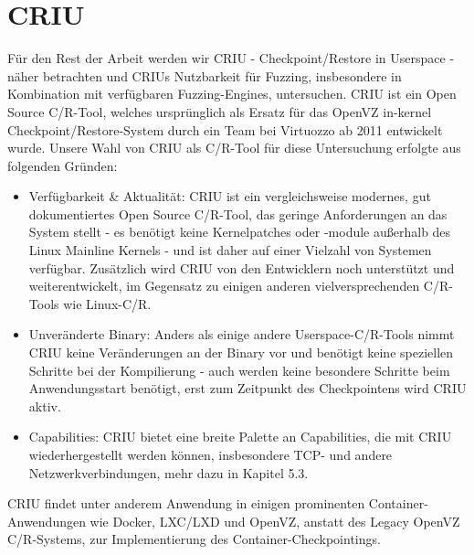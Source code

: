 \documentclass[a4paper]{article}
\begin{document}



\section{CRIU}
Für den Rest der Arbeit werden wir CRIU - Checkpoint/Restore in Userspace - näher betrachten und CRIUs Nutzbarkeit für Fuzzing, insbesondere in Kombination mit verfügbaren Fuzzing-Engines, untersuchen. 
CRIU ist ein Open Source C/R-Tool, welches ursprünglich als Ersatz für das OpenVZ in-kernel Checkpoint/Restore-System durch ein Team bei Virtuozzo ab 2011 entwickelt wurde\cite{criuhistory}. 
Unsere Wahl von CRIU als C/R-Tool für diese Untersuchung erfolgte aus folgenden Gründen:
\begin{itemize}
    \item Verfügbarkeit \& Aktualität: CRIU ist ein vergleichsweise modernes, gut dokumentiertes Open Source C/R-Tool, das geringe Anforderungen an das System stellt - es benötigt keine Kernelpatches oder -module außerhalb des Linux Mainline Kernels - und ist daher auf einer Vielzahl von Systemen verfügbar. Zusätzlich wird CRIU von den Entwicklern noch unterstützt und weiterentwickelt, im Gegensatz zu einigen anderen vielversprechenden C/R-Tools wie Linux-C/R.
    \item Unveränderte Binary: Anders als einige andere Userspace-C/R-Tools nimmt CRIU keine Veränderungen an der Binary vor und benötigt keine speziellen Schritte bei der Kompilierung - auch werden keine besondere Schritte beim Anwendungsstart benötigt, erst zum Zeitpunkt des Checkpointens wird CRIU aktiv.
    \item Capabilities: CRIU bietet eine breite Palette an Capabilities, die mit CRIU wiederhergestellt werden können, insbesondere TCP- und andere Netzwerkverbindungen, mehr dazu in Kapitel 5.3.
\end{itemize}
CRIU findet unter anderem Anwendung in einigen prominenten Container-Anwendungen wie Docker, LXC/LXD und OpenVZ, anstatt des Legacy OpenVZ C/R-Systems, zur Implementierung des Container-Checkpointings.\\
\end{document}

